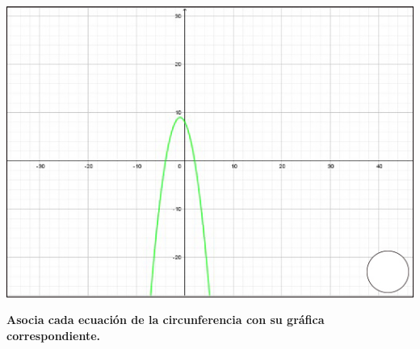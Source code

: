 \documentclass[12pt, addpoints, answers]{exam}
\begin{document}
\begin{questions}
\begin{minipage}[t]{0.23\linewidth}
\end{minipage}\hfill	
\begin{minipage}[t]{0.23\linewidth}
	\includegraphics[width=1\linewidth]{Figuras/fig8}
\end{minipage}
\par\vspace{0.5cm}
\question[1]\textbf{Asocia cada ecuación de la circunferencia con su gráfica correspondiente.}	
\end{questions}
\end{document}
